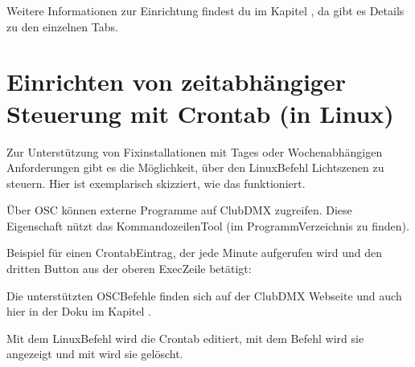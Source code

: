 \documentclass[letterpaper,10pt,ngerman]{sphinxmanual}
\begin{document}
\noindent{}

Weitere Informationen zur Einrichtung findest du im Kapitel
{\hyperref[\detokenize{arbeiten:arbeiten-label}]{}}, da gibt es Details zu den einzelnen Tabs.


\section{Einrichten von zeitabhängiger Steuerung mit Crontab (in Linux)}
\label{\detokenize{einrichten:einrichten-von-zeitabhangiger-steuerung-mit-crontab-in-linux}}\label{\detokenize{einrichten:crontab-label}}
Zur Unterstützung von Fixinstallationen mit Tages\sphinxhyphen{} oder
Wochen\sphinxhyphen{}abhängigen Anforderungen gibt es die Möglichkeit, über den
Linux\sphinxhyphen{}Befehl  Lichtszenen zu steuern. Hier ist exemplarisch
skizziert, wie das funktioniert.

Über OSC können externe Programme auf ClubDMX zugreifen. Diese Eigenschaft
nützt das Kommandozeilen\sphinxhyphen{}Tool 
(im Programm\sphinxhyphen{}Verzeichnis zu finden).

Beispiel für einen Crontab\sphinxhyphen{}Eintrag, der jede Minute aufgerufen wird und
den dritten Button aus der oberen Exec\sphinxhyphen{}Zeile betätigt:

\begin{sphinxVerbatim}[commandchars=\\\{\}]
      
\end{sphinxVerbatim}

Die unterstützten OSC\sphinxhyphen{}Befehle finden sich auf der ClubDMX Webseite und auch
hier in der Doku im Kapitel {\hyperref[\detokenize{arbeiten:osc-commands}]{}}.

Mit dem Linux\sphinxhyphen{}Befehl  wird die Crontab editiert, mit dem
Befehl  wird sie angezeigt und mit  wird sie
gelöscht.
\end{document}
